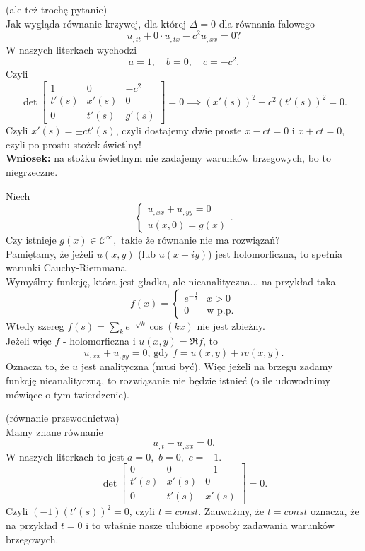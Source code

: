 \documentclass[../main.tex]{subfiles}
\begin{document}
\begin{przyklad}
		(ale też trochę pytanie)\\
		Jak wygląda równanie krzywej, dla której $\Delta = 0$ dla równania falowego
		\[
		u_{,t t} + 0 \cdot u_{,tx} - c^2 u_{,x x} =0 ?
		\]
		W naszych literkach wychodzi
		\[
		a = 1,\quad b = 0,\quad c = -c^2
		.\]
		Czyli
		\[
				\det \begin{bmatrix} 1&0&-c^2\\t'(s)&x'(s)&0\\0&t'(s)&g'(s) \end{bmatrix} = 0 \implies \left( x'(s) \right) ^2 - c^2 \left( t'(s) \right) ^2 = 0
		.\]
		Czyli $x'(s) = \pm ct'(s)$, czyli dostajemy dwie proste $x - ct = 0$ i $x + ct = 0,$ czyli po prostu stożek świetlny!\\
		\textbf{Wniosek:} na stożku świetlnym nie zadajemy warunków brzegowych, bo to niegrzeczne.
\end{przyklad}
\begin{przyklad}
		Niech
		\[
		\begin{cases}
				u_{,x x} + u_{,y y} = 0\\
				u(x,0) = g(x)
		\end{cases}
		.\]
		Czy istnieje $g(x)\in \mathcal{C}^\infty,$ takie że równanie nie ma rozwiązań?\\
		Pamiętamy, że jeżeli $u(x,y)$ (lub $u(x+iy)$) jest holomorficzna, to spełnia warunki Cauchy-Riemmana.\\
		Wymyślmy funkcję, która jest gładka, ale nieanalityczna... na przykład taka
		\[
				f(x) = \begin{cases}
						e^{-\frac{1}{x}}&x>0\\
						0& \text{w p.p.}
				\end{cases}
		\]
		Wtedy szereg $f(s) = \sum_{k} e^{-\sqrt{k}} \cos(kx)$ nie jest zbieżny.\\
		Jeżeli więc $f$ - holomorficzna i $u(x,y) = \Re f$, to
		\[
				u_{,x x} + u_{,y y} = 0 \text{, gdy }f = u(x,y) + iv(x,y)
		.\]
		Oznacza to, że $u$ jest analityczna (musi być). Więc jeżeli na brzegu zadamy funkcję nieanalityczną, to rozwiązanie nie będzie istnieć (o ile udowodnimy mówiące o tym twierdzenie).
\end{przyklad}
\begin{przyklad}
		(równanie przewodnictwa)\\
		Mamy znane równanie
		\[
		u_{,t} - u_{,x x} = 0
		.\]
		W naszych literkach to jest $a = 0,$ $b = 0,$ $c = -1$.
		\[
				\det \begin{bmatrix} 0&0&-1\\t'(s)&x'(s)&0\\0&t'(s)&x'(s) \end{bmatrix} = 0
		.\]
		Czyli $(-1)(t'(s))^2 = 0$, czyli $t = const.$ Zauważmy, że $t = const$ oznacza, że na przykład $t = 0$ i to właśnie nasze ulubione sposoby zadawania warunków brzegowych.
\end{przyklad}
\end{document}
